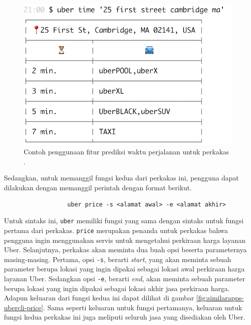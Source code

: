 \documentclass[a4paper,twoside]{article}
\begin{document}
\begin{enumerate}
\begin{figure}[ht]
    \centering
    \includegraphics[width=0.425\linewidth]{ubercli-time}
    \caption[Contoh penggunaan perkakas \ubercli (\textit{time})]{Contoh penggunaan fitur prediksi waktu perjalanan untuk perkakas \ubercli.\protect\footnotemark}
    \label{fig:similarapps-ubercli-time}
\end{figure}
\newpage\noindent %
Sedangkan, untuk memanggil fungsi kedua dari perkakas ini, pengguna dapat dilakukan dengan memanggil perintah dengan format berikut.

\begin{verbatim}
                  uber price -s <alamat awal> -e <alamat akhir>
\end{verbatim}

Untuk sintaks ini, \verb|uber| memiliki fungsi yang sama dengan sintaks untuk fungsi pertama dari perkakas. \verb|price| merupakan penanda untuk perkakas bahwa pengguna ingin menggunakan servis untuk mengetahui perkiraan harga layanan Uber. Selanjutnya, perkakas akan meminta dua buah opsi beserta parameternya masing-masing. Pertama, opsi \verb|-s|, berarti \textit{start}, yang akan meminta sebuah parameter berupa lokasi yang ingin dipakai sebagai lokasi awal perkiraan harga layanan Uber. Sedangkan opsi \verb|-e|, berarti \textit{end}, akan meminta sebuah parameter berupa lokasi yang ingin dipakai sebagai lokasi akhir jasa perkiraan harga.
\newline\newline\noindent
Adapun keluaran dari fungsi kedua ini dapat dilihat di gambar \ref{fig:similarapps-ubercli-price}. Sama seperti keluaran untuk fungsi pertamanya, keluaran untuk fungsi kedua perkakas ini juga meliputi seluruh jasa yang disediakan oleh Uber.


\end{enumerate}
\end{document}
